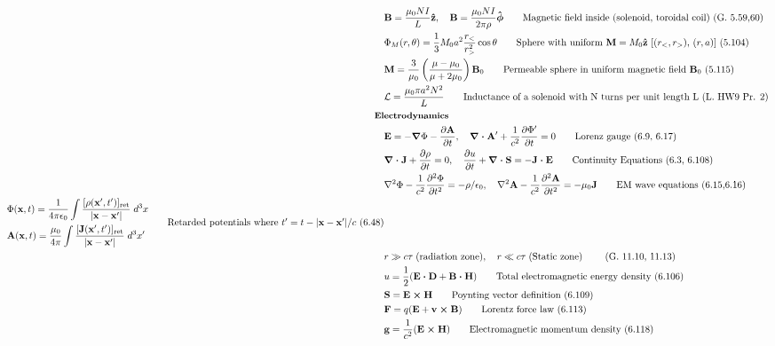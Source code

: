 \documentclass[10pt]{article}
\newcommand{\zhat}{\boldsymbol{\hat{\textbf{z}}}}
\newcommand{\phihat}{\boldsymbol{\hat{\textbf{$\phi$}}}}
\newcommand{\ve}[1]{\boldsymbol{\mathbf{#1}}}
\newcommand{\vect}[1]{\boldsymbol{\mathbf{#1}}}
\newcommand{\eo}{\epsilon_0}
\newcommand{\pder}[2]{\frac{\partial #1}{\partial #2}}
\newcommand{\dpder}[2]{\frac{\partial^2 #1}{\partial #2^2}}
\newcommand{\K}{\frac{1}{4 \pi \eo}}
\begin{document}
\begin{multicols}{2}
\begin{align*}
		& \ve{B} = \frac{\mu_0 N I}{L} \zhat, \quad \ve{B} = \frac{\mu_0 N I}{2 \pi \rho} \phihat \tag*{Magnetic field inside (solenoid, toroidal coil) (G. 5.59,60)} \\
		& \Phi_M(r,\theta) = \frac{1}{3} M_0 a^2 \frac{r_<}{r_>^2} \cos \theta \tag*{Sphere with uniform $\ve{M} = M_0 \zhat$ [$(r_<,r_>)$, $(r,a)$] (5.104)} \\
		& \vect{M} = \frac{3}{\mu_0} \left( \frac{\mu - \mu_0}{\mu + 2 \mu_0} \right) \vect{B}_0 \tag*{Permeable sphere in uniform magnetic field $\ve{B}_0$ (5.115)} \\
		& \mathcal{L} = \frac{\mu_0 \pi a^2 N^2}{L} \tag*{Inductance of a solenoid with N turns per unit length L (L. HW9 Pr. 2)} \\	
	& \small \hspace{-10pt} \textbf{Electrodynamics} \small \\
		& \ve{E} = -\ve{\nabla} \Phi - \pder{\ve{A}}{t}, \quad \ve{\nabla \cdot A}' + \frac{1}{c^2} \pder{\Phi'}{t} = 0 \tag*{Lorenz gauge (6.9, 6.17)} \\
		& \ve{\nabla \cdot J} + \pder{\rho}{t} = 0, \quad \pder{u}{t} + \ve{\nabla \cdot S} = - \ve{J \cdot E} \tag*{Continuity Equations (6.3, 6.108)} \\
		& \nabla^2 \Phi - \frac{1}{c^2} \dpder{\Phi}{t} = -\rho / \eo, \quad \nabla^2 \ve{A} - \frac{1}{c^2} \dpder{\ve{A}}{t} = -\mu_0 \ve{J} \tag*{EM wave equations (6.15,6.16)} \\
		\begin{split}
			& \Phi(\ve{x},t) = \K \int \frac{[\rho(\ve{x}',t')]_\text{ret}}{|\ve{x} - \ve{x}'|} \; d^3 x \\
			& \ve{A}(\ve{x},t) = \frac{\mu_0}{4 \pi} \int \frac{[\ve{J}(\ve{x}',t')]_\text{ret}}{|\ve{x} - \ve{x}'|} \; d^3 x' \\
		\end{split} \tag*{Retarded potentials where $t' = t - |\ve{x} - \ve{x}'| / c$ (6.48)} \\
		& r \gg c \tau \; \text{(radiation zone)}, \quad r \ll c \tau \; \text{(Static zone)} \tag*{ (G. 11.10, 11.13)} \\
		& u = \frac{1}{2}(\ve{E \cdot D} + \ve{B \cdot H}) \tag*{Total electromagnetic energy density (6.106)} \\
		& \ve{S} = \ve{E \times H} \tag*{Poynting vector definition (6.109)} \\
		& \ve{F} = q(\ve{E} + \ve{v \times B}) \tag*{Lorentz force law (6.113)} \\
		& \ve{g} = \frac{1}{c^2} (\ve{E \times H}) \tag*{Electromagnetic momentum density (6.118)} \\

\end{align*}
\end{multicols}
\end{document}
